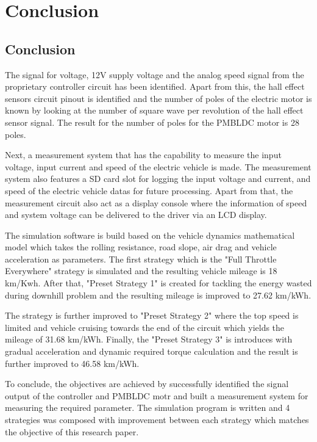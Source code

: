 \chapter{Conclusion}

\section{Conclusion}
The signal for voltage, 12V supply voltage and the analog speed signal from the proprietary controller circuit has been identified. Apart from this, the hall effect sensors circuit pinout is identified and the number of poles of the electric motor is known by looking at the number of square wave per revolution of the hall effect sensor signal. The result for the number of poles for the PMBLDC motor is 28 poles.

Next, a measurement system that has the capability to measure the input voltage, input current and speed of the electric vehicle is made. The measurement system also features a SD card slot for logging the input voltage and current, and speed of the electric vehicle datas for future processing. Apart from that, the measurement circuit also act as a display console where the information of speed and system voltage can be delivered to the driver via an LCD display.

The simulation software is build based on the vehicle dynamics mathematical model which takes the rolling resistance, road slope, air drag and vehicle acceleration as parameters. The first strategy which is the "Full Throttle Everywhere" strategy is simulated and the resulting vehicle mileage is 18 km/Kwh. After that, "Preset Strategy 1" is created for tackling the energy wasted during downhill problem and the resulting mileage is improved to 27.62 km/kWh.

The strategy is further improved to "Preset Strategy 2" where the top speed is limited and vehicle cruising towards the end of the circuit which yields the mileage of 31.68 km/kWh. Finally, the "Preset Strategy 3" is introduces with gradual acceleration and dynamic required torque calculation and the result is further improved to 46.58 km/kWh.

To conclude, the objectives are achieved by successfully identified the signal output of the controller and PMBLDC motr and built a measurement system for measuring the required parameter. The simulation program is written and 4 strategies was composed with improvement between each strategy which matches the objective of this research paper.

